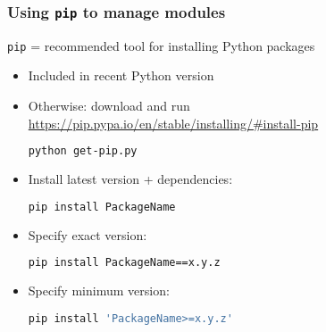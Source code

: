 \begin{frame}[fragile]
\frametitle{Using \texttt{pip} to manage modules}

\texttt{pip} = recommended tool for installing Python packages

\begin{description}
\item<2->[Installation:]
\begin{itemize}
\item Included in recent Python version
\item Otherwise: download and run \\
\url{https://pip.pypa.io/en/stable/installing/\#install-pip}
\begin{lstlisting}[language=bash]
python get-pip.py
\end{lstlisting}
\end{itemize}

\item<3->[Usage:]
\begin{itemize}
\item Install latest version + dependencies:
\begin{lstlisting}[language=bash]
pip install PackageName
\end{lstlisting}

\item Specify exact version:
\begin{lstlisting}[language=bash]
pip install PackageName==x.y.z
\end{lstlisting}
\item Specify minimum version:
\begin{lstlisting}[language=bash]
pip install 'PackageName>=x.y.z'
\end{lstlisting}
\end{itemize}

\end{description}

\end{frame}

